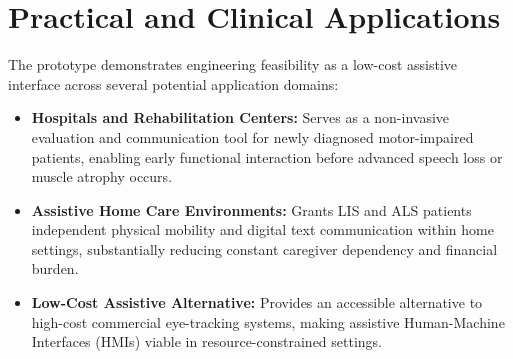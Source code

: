 \section{Practical and Clinical Applications}
\label{sec:practical_clinical_applications}

The prototype demonstrates engineering feasibility as a low-cost assistive interface across several potential application domains:

\begin{itemize}
    \item \textbf{Hospitals and Rehabilitation Centers:} Serves as a non-invasive evaluation and communication tool for newly diagnosed motor-impaired patients, enabling early functional interaction before advanced speech loss or muscle atrophy occurs.

    \item \textbf{Assistive Home Care Environments:} Grants LIS and ALS patients independent physical mobility and digital text communication within home settings, substantially reducing constant caregiver dependency and financial burden.

    \item \textbf{Low-Cost Assistive Alternative:} Provides an accessible alternative to high-cost commercial eye-tracking systems, making assistive Human-Machine Interfaces (HMIs) viable in resource-constrained settings.
\end{itemize}
